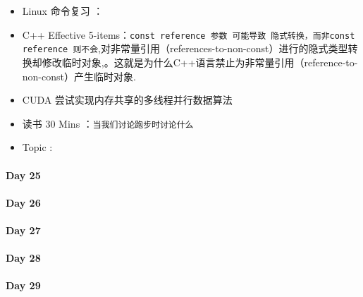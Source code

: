 \documentclass[UTF8,a4paper,8pt]{ctexart}
\begin{document}
		
	 	 \begin{itemize}[itemindent = 1em]
	 	 	\renewcommand\labelitemi{\makebox[0pt][l]{$\square$}\hspace{1em}} 
	 	 	\renewcommand\labelitemi{\makebox[0pt][l]{$\square$}\raisebox{.15ex}{\hspace{0.1em}$\checkmark$}}	 	
	 	 	\item   Linux 命令复习 ：
	 	 	\item   C++ Effective 5-items：\verb|const reference 参数 可能导致 隐式转换，而非const reference 则不会|,对非常量引用（references-to-non-const）进行的隐式类型转换却修改临时对象,。这就是为什么C++语言禁止为非常量引用（reference-to-non-const）产生临时对象.
	 	 	
	 	 	\item   CUDA 尝试实现内存共享的多线程并行数据算法
	 	 	
	 	 	\item   读书  30 Mins	：\verb|当我们讨论跑步时讨论什么|	
	 	 	\renewcommand\labelitemi{\makebox[0pt][l]{$\square$}\hspace{1em}} 
	 	 	
	 	 	\renewcommand\labelitemi{\makebox[0pt][l]{$\square$}\raisebox{.15ex}{\hspace{0.1em}$\checkmark$}}
	 	 	\item   Topic : 
	 	 \end{itemize}
 	 \paragraph{Day 25      \quad     }
 	 \paragraph{Day 26      \quad     }
 	 \paragraph{Day 27      \quad     }
 	 \paragraph{Day 28      \quad     }
 	 \paragraph{Day 29      \quad     }   
\end{document}
